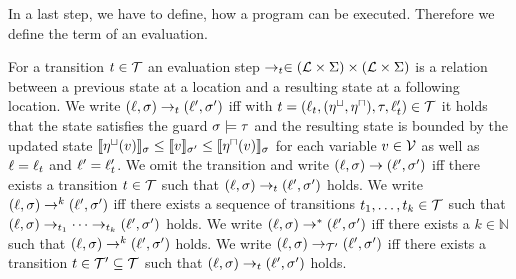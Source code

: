 In a last step, we have to define, how a program can be executed.
Therefore we define the term of an evaluation.

\begin{definition}[Evaluation] 
  For a transition $t \in \mathcal{T}$ an evaluation step $\rightarrow_t \in (\mathcal{L} \times \Sigma) \times (\mathcal{L} \times \Sigma)$ is a relation between a previous state at a location and a resulting state at a following location.
  We write $(\ell, \sigma) \rightarrow_t (\ell', \sigma')$ iff with $t = (\ell_t, (\eta^\sqcup, \eta^\sqcap), \tau, \ell_t') \in \mathcal{T}$ it holds that the state satisfies the guard $\sigma \models \tau$ and the resulting state is bounded by the updated state $ \llbracket \eta^\sqcup(v) \rrbracket_{\sigma} \leq \llbracket v \rrbracket_{\sigma'} \leq \llbracket \eta^\sqcap(v) \rrbracket_{\sigma}$ for each variable $v \in \mathcal{V}$ as well as $\ell = \ell_t$ and $\ell' = \ell_t'$.
  We omit the transition and write $(\ell, \sigma) \rightarrow (\ell', \sigma')$ iff there exists a transition $t \in \mathcal{T}$ such that $(\ell, \sigma) \rightarrow_t (\ell', \sigma')$ holds.
  We write $(\ell, \sigma) \rightarrow^k (\ell', \sigma')$ iff there exists a sequence of transitions $t_1, \dots, t_k \in \mathcal{T}$ such that $(\ell, \sigma) \rightarrow_{t_1} \dots \rightarrow_{t_k} (\ell', \sigma')$ holds.
  We write $(\ell, \sigma) \rightarrow^* (\ell', \sigma')$ iff there exists a $k \in \mathbb{N}$ such that $(\ell, \sigma) \rightarrow^k (\ell', \sigma')$ holds.
  We write $(\ell, \sigma) \rightarrow_{\mathcal{T}'} (\ell', \sigma')$ iff there exists a transition $t \in \mathcal{T}' \subseteq \mathcal{T}$ such that $(\ell, \sigma) \rightarrow_t (\ell', \sigma')$ holds.
\end{definition}
